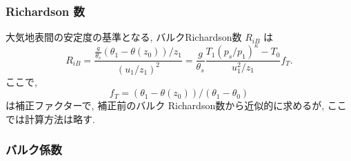 \subsubsection{Richardson 数}

大気地表間の安定度の基準となる,
バルクRichardson数 $R_{iB}$ は
%
\begin{equation}
R_{iB} = \frac{ \frac{g}{\theta_s} (\theta_1 - \theta(z_0))/z_1 }
              { (u_1/z_1)^2                                  }
       = \frac{g}{\theta_s} 
         \frac{T_1 (p_s/p_1)^\kappa - T_0 }{u_1^2/z_1} f_T .
\end{equation}
ここで, 
\begin{equation}
f_T = (\theta_1 - \theta(z_0))/(\theta_1 - \theta_0)
\end{equation}
は補正ファクターで, 補正前のバルク Richardson数から近似的に求めるが, 
ここでは計算方法は略す. 

\subsubsection{バルク係数}

